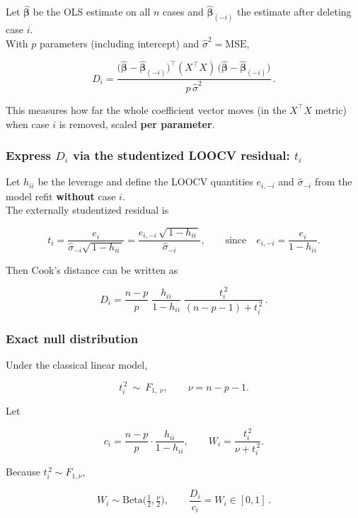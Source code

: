 \documentclass[
  letterpaper,
  DIV=11,
  numbers=noendperiod]{scrreprt}
\begin{document}
Let \(\hat{\boldsymbol\beta}\) be the OLS estimate on all \(n\) cases
and \(\hat{\boldsymbol\beta}_{(-i)}\) the estimate after deleting case
\(i\).\\
With \(p\) parameters (including intercept) and
\(\hat\sigma^2=\mathrm{MSE}\),

\[
D_i
= \frac{\big(\hat{\boldsymbol\beta}-\hat{\boldsymbol\beta}_{(-i)}\big)^{\!\top}
(X^{\!\top}X)\,\big(\hat{\boldsymbol\beta}-\hat{\boldsymbol\beta}_{(-i)}\big)}{p\,\hat\sigma^{2}} \, .
\]

This measures how far the whole coefficient vector moves (in the
\(X^{\!\top}X\) metric) when case \(i\) is removed, scaled \textbf{per
parameter}.

\subsubsection{\texorpdfstring{Express \(D_i\) via the
\textbf{studentized LOOCV residual}:
\(t_i\)}{Express D\_i via the studentized LOOCV residual: t\_i}}\label{express-d_i-via-the-studentized-loocv-residual-t_i}

Let \(h_{ii}\) be the leverage and define the LOOCV quantities
\(e_{i,-i}\) and \(\hat\sigma_{-i}\) from the model refit
\textbf{without} case \(i\).\\
The externally studentized residual is

\[
t_i
=\frac{e_i}{\hat{\sigma}_{-i}\sqrt{\,1-h_{ii}\,}}
=\frac{e_{i,-i}\,\sqrt{\,1-h_{ii}\,}}{\hat{\sigma}_{-i}},
\qquad\text{since}\quad e_{i,-i}=\frac{e_i}{1-h_{ii}}.
\]

Then Cook's distance can be written as

\[
D_i
= \frac{n-p}{p}\;\frac{h_{ii}}{1-h_{ii}}\;
\frac{t_i^{\,2}}{(n-p-1)+t_i^{\,2}} \, .
\]

\subsubsection{Exact null distribution}\label{exact-null-distribution}

Under the classical linear model,

\[
t_i^{\,2}\ \sim\ F_{1,\ \nu},\qquad \nu=n-p-1 .
\]

Let

\[
c_i=\frac{n-p}{p}\cdot\frac{h_{ii}}{1-h_{ii}},\qquad
W_i=\frac{t_i^{\,2}}{\nu+t_i^{\,2}} .
\]

Because \(t_i^{\,2}\sim F_{1,\nu}\),

\[
W_i\sim \mathrm{Beta}\!\Big(\tfrac12,\tfrac{\nu}{2}\Big),
\qquad
\frac{D_i}{c_i}=W_i\in[0,1] \, .
\]
\end{document}
